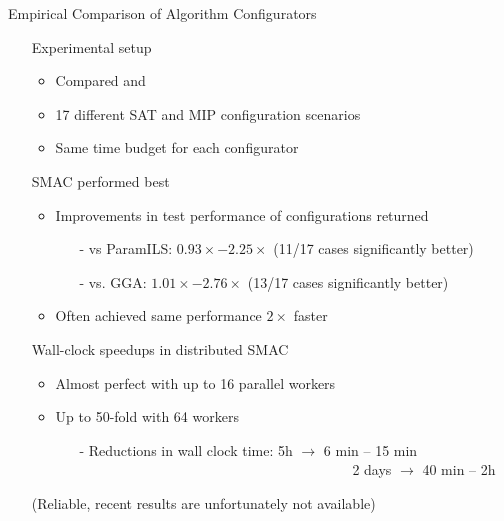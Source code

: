 \begin{frame}{Empirical Comparison of Algorithm Configurators}

\begin{itemize}
	\item[] Experimental setup 
	\begin{itemize}
		\item Compared \smac{} \vs{} \paramils{} and \gga{}
		\item 17 different SAT and MIP configuration scenarios
		\item Same time budget for each configurator
	\end{itemize}

\pause
\medskip

	\item[] SMAC performed best
	\begin{itemize}
		\item Improvements in test performance of configurations returned 
		\begin{itemize}
			\item[-] vs ParamILS: $0.93\times - 2.25\times$ (11/17 cases significantly better)
			\item[-] vs. GGA: $1.01\times - 2.76\times$ (13/17 cases significantly better)		
		\end{itemize}
		\item Often achieved same performance $2\times$ faster
	\end{itemize}

\pause
\medskip

	\item[] Wall-clock speedups in distributed SMAC 
	\begin{itemize}
		\item Almost perfect with up to 16 parallel workers
		\item Up to 50-fold with 64 workers
		\begin{itemize}
			\item[-] Reductions in wall clock time: 5h $\rightarrow$ 6 min -- 15 min\\
			~~~~~~~~~~~~~~~~~~~~~~~~~~~~~~~~~~~~~~~2 days $\rightarrow$ 40 min -- 2h
		\end{itemize}
	\end{itemize}
	
\pause
\medskip
\item[] (Reliable, recent results are unfortunately not available)
\end{itemize}
\end{frame}

